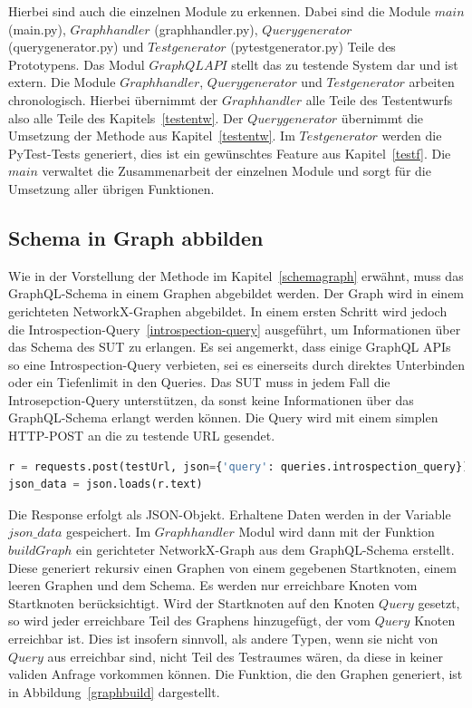 Hierbei sind auch die einzelnen Module zu erkennen.
Dabei sind die Module $main$ (main.py), $Graphhandler$ (graphhandler.py), $Querygenerator$ (querygenerator.py) und $Testgenerator$ (pytestgenerator.py) Teile des Prototypens.
Das Modul $GraphQL API$ stellt das zu testende System dar und ist extern.
Die Module $Graphhandler$, $Querygenerator$ und $Testgenerator$ arbeiten chronologisch.
Hierbei übernimmt der $Graphhandler$ alle Teile des Testentwurfs also alle Teile des Kapitels~\ref{testentw}.
Der $Querygenerator$ übernimmt die Umsetzung der Methode aus Kapitel~\ref{testentw}.
Im $Testgenerator$ werden die PyTest-Tests generiert, dies ist ein gewünschtes Feature aus Kapitel~\ref{testf}.
Die $main$ verwaltet die Zusammenarbeit der einzelnen Module und sorgt für die Umsetzung aller übrigen Funktionen.

\subsection{Schema in Graph abbilden}

Wie in der Vorstellung der Methode im Kapitel~\ref{schemagraph} erwähnt, muss das GraphQL-Schema in einem Graphen abgebildet werden.
Der Graph wird in einem gerichteten NetworkX-Graphen abgebildet.
In einem ersten Schritt wird jedoch die Introspection-Query~\ref{introspection-query} ausgeführt, um Informationen über das Schema des SUT zu erlangen.
Es sei angemerkt, dass einige GraphQL APIs so eine Introspection-Query verbieten, sei es einerseits durch direktes Unterbinden oder ein Tiefenlimit in den Queries.
Das SUT muss in jedem Fall die Introsepction-Query unterstützen, da sonst keine Informationen über das GraphQL-Schema erlangt werden können.
Die Query wird mit einem simplen HTTP-POST an die zu testende URL gesendet.

\begin{lstlisting}[language=Python, caption={Absenden der Introspection-Query}]
r = requests.post(testUrl, json={'query': queries.introspection_query})
json_data = json.loads(r.text)
\end{lstlisting}

Die Response erfolgt als JSON-Objekt.
Erhaltene Daten werden in der Variable $json\_data$ gespeichert.
Im $Graphhandler$ Modul wird dann mit der Funktion $buildGraph$ ein gerichteter NetworkX-Graph aus dem GraphQL-Schema erstellt.
Diese generiert rekursiv einen Graphen von einem gegebenen Startknoten, einem leeren Graphen und dem Schema.
Es werden nur erreichbare Knoten vom Startknoten berücksichtigt.
Wird der Startknoten auf den Knoten $Query$ gesetzt, so wird jeder erreichbare Teil des Graphens hinzugefügt, der vom $Query$ Knoten erreichbar ist.
Dies ist insofern sinnvoll, als andere Typen, wenn sie nicht von $Query$ aus erreichbar sind, nicht Teil des Testraumes wären, da diese in keiner validen Anfrage vorkommen können.
Die Funktion, die den Graphen generiert, ist in Abbildung~\ref{graphbuild} dargestellt.


